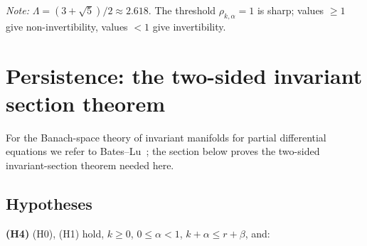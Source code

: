 \documentclass[11pt,a4paper]{article}
\theoremstyle{plain}
\theoremstyle{definition}
\theoremstyle{remark}
\numberwithin{equation}{section}
\numberwithin{figure}{section}
\begin{document}
\begin{table}[h]
\centering
{}
\caption{Numerical illustration of the toral automorphism Example 4.5}
\label{tab:table45}
\end{table}

\textit{Note:} $\Lambda=(3+\sqrt5)/2\approx 2.618$. The threshold $\rho_{k,\alpha}=1$ is sharp; values $\ge1$ give non-invertibility, values $<1$ give invertibility.

\section{Persistence: the two-sided invariant section theorem}

For the Banach-space theory of invariant manifolds for partial differential equations we refer to Bates–Lu~\cite{bates1995}; the section below proves the two-sided invariant-section theorem needed here.

\subsection{Hypotheses}

\textbf{(H4)} (H0), (H1) hold, $k\ge0$, $0\le\alpha<1$, $k+\alpha\le r+\beta$, and:
\end{document}
